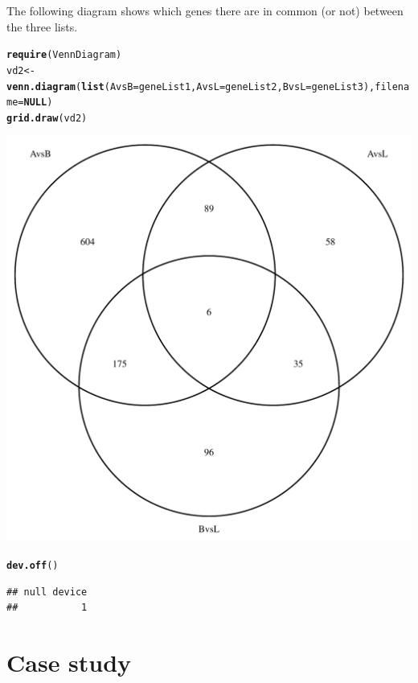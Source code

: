 \documentclass{article}\usepackage[]{graphicx}\usepackage[]{color}
\makeatletter
\def\maxwidth{ %
  \ifdim\Gin@nat@width>\linewidth
    \linewidth
  \else
    \Gin@nat@width
  \fi
}
\newcommand{\hlstd}[1]{\textcolor[rgb]{0.345,0.345,0.345}{#1}}%
\newcommand{\hlkwa}[1]{\textcolor[rgb]{0.161,0.373,0.58}{\textbf{#1}}}%
\newcommand{\hlkwb}[1]{\textcolor[rgb]{0.69,0.353,0.396}{#1}}%
\newcommand{\hlkwc}[1]{\textcolor[rgb]{0.333,0.667,0.333}{#1}}%
\newcommand{\hlkwd}[1]{\textcolor[rgb]{0.737,0.353,0.396}{\textbf{#1}}}%
\newenvironment{kframe}{%
 \def\at@end@of@kframe{}%
 \ifinner\ifhmode%
  \def\at@end@of@kframe{\end{minipage}}%
  \begin{minipage}{\columnwidth}%
 \fi\fi%
 \def\FrameCommand##1{\hskip\@totalleftmargin \hskip-\fboxsep
 \colorbox{shadecolor}{##1}\hskip-\fboxsep
     \hskip-\linewidth \hskip-\@totalleftmargin \hskip\columnwidth}%
 \MakeFramed {\advance\hsize-\width
   \@totalleftmargin\z@ \linewidth\hsize
   \@setminipage}}%
 {\par\unskip\endMakeFramed%
 \at@end@of@kframe}
\newenvironment{knitrout}{}{} %
\makeatother
\begin{document}
The following diagram shows which genes there are in common (or not) between the three lists.

\begin{knitrout}
\color{fgcolor}\begin{kframe}
\begin{alltt}
\hlkwd{require}\hlstd{(VennDiagram)}
\hlstd{vd2}\hlkwb{<-} \hlkwd{venn.diagram}\hlstd{(}\hlkwd{list}\hlstd{(}\hlkwc{AvsB}\hlstd{=geneList1,} \hlkwc{AvsL}\hlstd{=geneList2,}  \hlkwc{BvsL}\hlstd{=geneList3),} \hlkwc{filename}\hlstd{=}\hlkwa{NULL}\hlstd{)}
\hlkwd{grid.draw}\hlstd{(vd2)}
\end{alltt}
\end{kframe}
\includegraphics[width=\maxwidth]{images/graficvennSigGenes2-1} 
\begin{kframe}\begin{alltt}
\hlkwd{dev.off}\hlstd{()}
\end{alltt}
\begin{verbatim}
## null device 
##           1
\end{verbatim}
\end{kframe}
\end{knitrout}

\section{Case study}
\end{document}
